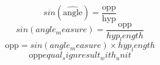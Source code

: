 \[sin(\widehat{{\text{{{angle}}}}})=\frac{{\text{{{opp}}}}}{{\text{{{hyp}}}}}\]
\[sin({angle_measure})=\frac{\text{{{opp}}}}{{{hyp_length}}}\]
\[\text{{{opp}}}=sin({angle_measure})\times {hyp_length}\]
\[\text{{{opp}}}{equal_sign}{result_with_unit}\]
